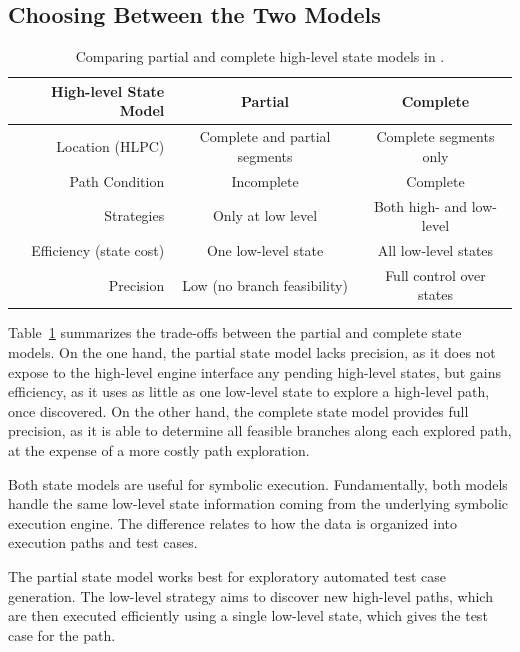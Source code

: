 \subsection{Choosing Between the Two Models}

\newcommand{\goodcolor}{\cellcolor{LimeGreen}}
\newcommand{\badcolor}{\cellcolor{Lavender}}

\begin{table}
  \centering
  \small
  \begin{tabular}{r c c}
    High-level State Model & \textbf{Partial} & \textbf{Complete}               \\
    \hline
    \noalign{\smallskip}
    Location (HLPC) & Complete and partial segments & Complete segments only    \\
    Path Condition  & Incomplete                    & Complete                  \\
    Strategies      & Only at low level             & Both high- and low-level  \\
    \noalign{\smallskip}
    \hline
    \noalign{\smallskip}
    Efficiency (state cost) & \goodcolor One low-level state   & \badcolor All low-level states      \\
    Precision       & \badcolor Low (no branch feasibility)   & \goodcolor Full control over states  \\
  \end{tabular}
  \caption{Comparing partial and complete high-level state models in \chef.}
  \label{tab:chef:hl-states}
\end{table}

Table~\ref{tab:chef:hl-states} summarizes the trade-offs between the partial and complete state models.
%
On the one hand, the partial state model lacks precision, as it does not expose to the high-level engine interface any pending high-level states, but gains efficiency, as it uses as little as one low-level state to explore a high-level path, once discovered.
%
On the other hand, the complete state model provides full precision, as it is able to determine all feasible branches along each explored path, at the expense of a more costly path exploration.

Both state models are useful for symbolic execution.
%
Fundamentally, both models handle the same low-level state information coming from the underlying symbolic execution engine.  The difference relates to how the data is organized into execution paths and test cases.

The partial state model works best for exploratory automated test case generation.
%
The low-level strategy aims to discover new high-level paths, which are then executed efficiently using a single low-level state, which gives the test case for the path.

